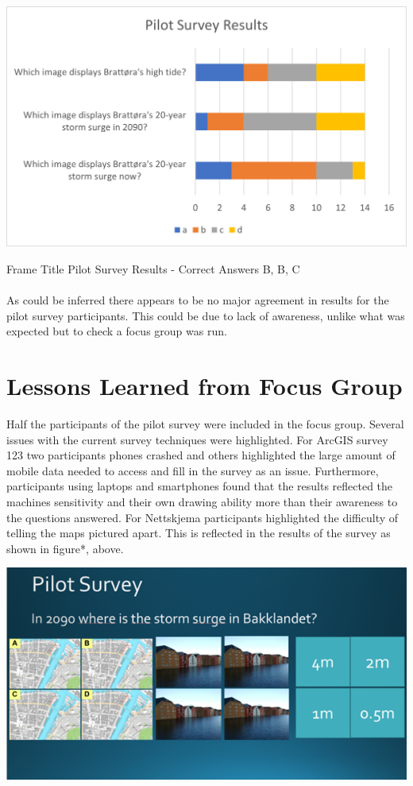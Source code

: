 \paragraph{}
\includegraphics[width=1\textwidth]{fig_results/pilot-survey-results.png}
\begin{frame}{Frame Title}
    Pilot Survey Results - Correct Answers B, B, C
\end{frame}
\paragraph{}

As could be inferred there appears to be no major agreement in results for the pilot survey participants. This could be due to lack of awareness, unlike what was expected but to check a focus group was run. 

\section{Lessons Learned from Focus Group}
Half the participants of the pilot survey were included in the focus group. Several issues with the current survey techniques were highlighted. For ArcGIS survey 123 two participants phones crashed and others highlighted the large amount of mobile data needed to access and fill in the survey as an issue. Furthermore, participants using laptops and smartphones found that the results reflected the machines sensitivity and their own drawing ability more than their awareness to the questions answered. For Nettskjema participants highlighted the difficulty of telling the maps pictured apart. This is reflected in the results of the survey as shown in figure*, above.

\includegraphics[width=1\textwidth]{fig_results/slide-pilot-survey.png}

